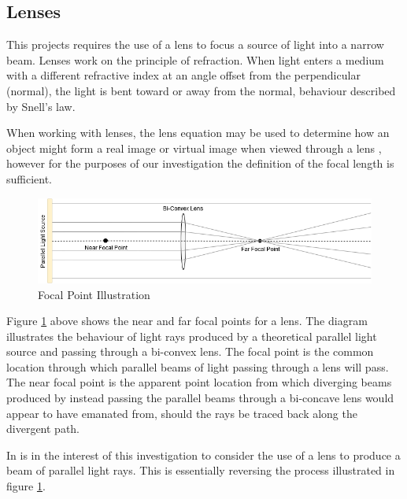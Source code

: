 \subsection{Lenses}
This projects requires the use of a lens to focus a source of light into a narrow beam. Lenses work on the principle of refraction. When light enters a medium with a different refractive index at an angle offset from the perpendicular (normal), the light is bent toward or away from the normal, behaviour described by Snell's law.

When working with lenses, the lens equation may be used to determine how an object might form a real image or virtual image when viewed through a lens \cite{Knight2013}, however for the purposes of our investigation the definition of the focal length is sufficient.

\begin{figure}[H]
	\centering
	\includegraphics[width=0.8\linewidth]{figures/litreview/lens_diagram.png}
	\caption{Focal Point Illustration}
	\label{fig:lens_diagram}
\end{figure}

Figure \ref{fig:lens_diagram} above shows the near and far focal points for a lens. The diagram illustrates the behaviour of light rays produced by a theoretical parallel light source and passing through a bi-convex lens. The focal point is the common location through which parallel beams of light passing through a lens will pass. The near focal point is the apparent point location from which diverging beams produced by instead passing the parallel beams through a bi-concave lens would appear to have emanated from, should the rays be traced back along the divergent path.

In is in the interest of this investigation to consider the use of a lens to produce a beam of parallel light rays. This is essentially reversing the process illustrated in figure \ref{fig:lens_diagram}.

